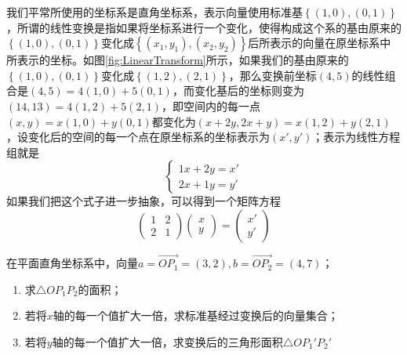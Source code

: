 我们平常所使用的坐标系是直角坐标系，表示向量使用标准基$\left\{ (1,0),(0,1) \right\}$，所谓的线性变换是指如果将坐标系进行一个变化，使得构成这个系的基由原来的$\left\{ (1,0),(0,1) \right\}$变化成$\left\{ (x_1,y_1),(x_2,y_2) \right\}$后所表示的向量在原坐标系中所表示的坐标。如图\ref{fig:LinearTransform}所示，如果我们的基由原来的$\left\{ (1,0),(0,1) \right\}$变化成$\left\{ (1,2),(2,1) \right\}$，那么变换前坐标$(4,5)$的线性组合是$(4,5)=4(1,0)+5(0,1)$，而变化基后的坐标则变为$(14,13)=4(1,2)+5(2,1)$，即空间内的每一点$(x,y)=x(1,0)+y(0,1)$都变化为$(x+2y,2x+y)=x(1,2)+y(2,1)$，设变化后的空间的每一个点在原坐标系的坐标表示为$(x',y')$；表示为线性方程组就是$$\left\{\begin{matrix} 
	1x+2y=x' \\  
	2x+1y=y'
  \end{matrix}\right. $$如果我们把这个式子进一步抽象，可以得到一个矩阵方程$$\begin{pmatrix}  
	1 & 2 \\  
	2 & 1  
  \end{pmatrix} \begin{pmatrix}  
	x \\  
	y  
  \end{pmatrix} =\begin{pmatrix}  
	x' \\  
	y'  
  \end{pmatrix}$$

\begin{example}
	在平面直角坐标系中，向量$a=\overrightarrow{OP_1}=(3,2),b=\overrightarrow{OP_2}=(4,7)$；
	\begin{enumerate}
		\item 求$\triangle OP_1P_2$的面积；
		\item 若将$x$轴的每一个值扩大一倍，求标准基经过变换后的向量集合；
		\item 若将$y$轴的每一个值扩大一倍，求变换后的三角形面积$\triangle OP_1'P_2'$
	\end{enumerate}
\end{example}